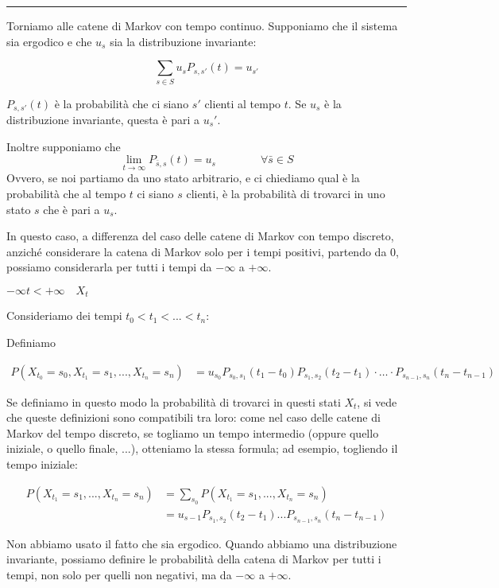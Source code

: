 \documentclass[a4paper,12pt]{book}
\begin{document}
\vspace{1cm}
\hrule
\vspace{1cm} 
Torniamo alle catene di Markov con tempo continuo. Supponiamo che il sistema sia ergodico e che $ u_s $ sia la distribuzione invariante:

$$ \sum_{s \in S} u_s P_{s,s'}(t) = u_{s'} $$

$ P_{s,s'}(t) $ è la probabilità che ci siano $ s' $ clienti al tempo $ t $. Se $ u_s $ è la distribuzione invariante, questa è pari a $ u_s' $.

Inoltre supponiamo che 
$$ \lim\limits_{ t \to \infty} P_{\bar{s}, s} (t) = u_s \qquad \qquad \forall \bar{s} \in S $$
Ovvero, se noi partiamo da uno stato arbitrario, e ci chiediamo qual è la probabilità che al tempo $ t $ ci siano $ s $ clienti, è la probabilità di trovarci in uno stato $ s $ che è pari a $ u_s $. 

In questo caso, a differenza del caso delle catene di Markov con tempo discreto, anziché considerare la catena di Markov solo per i tempi positivi, partendo da 0, possiamo considerarla per tutti i tempi da $ -\infty $ a $ +\infty $. 

$ -\infty t < +\infty \quad X_t$ 

Consideriamo dei tempi $ t_0 < t_1 < ... < t_n $:

Definiamo 

\begin{align*}
	P(X_{t_0} = s_0, X_{t_1} = s_1, ..., X_{t_n} = s_n) & = u_{s_0} P_{s_0, s_1}(t_1 - t_0) P_{s_1, s_2}(t_2 - t_1) \cdot \dots \cdot P_{s_{n-1}, s_n}(t_n - t_{n-1})
\end{align*}

Se definiamo in questo modo la probabilità di trovarci in questi stati $ X_t $, si vede che queste definizioni sono compatibili tra loro: come nel caso delle catene di Markov del tempo discreto, se togliamo un tempo intermedio (oppure quello iniziale, o quello finale, ...), otteniamo la stessa formula; ad esempio, togliendo il tempo iniziale:

\begin{align*}
	P(X_{t_1} = s_1, ..., X_{t_n} = s_n) & = \sum_{s_0} P(X_{t_1} = s_1, ..., X_{t_n} = s_n) \\
	& = u_{s-1} P_{s_1, s_2}(t_2 - t_1) ... P_{s_{n-1}, s_n}(t_n - t_{n-1}) 
\end{align*}

Non abbiamo usato il fatto che sia ergodico. Quando abbiamo una distribuzione invariante, possiamo definire le probabilità della catena di Markov per tutti i tempi, non solo per quelli non negativi, ma da $ -\infty $ a $ +\infty $.
\end{document}
